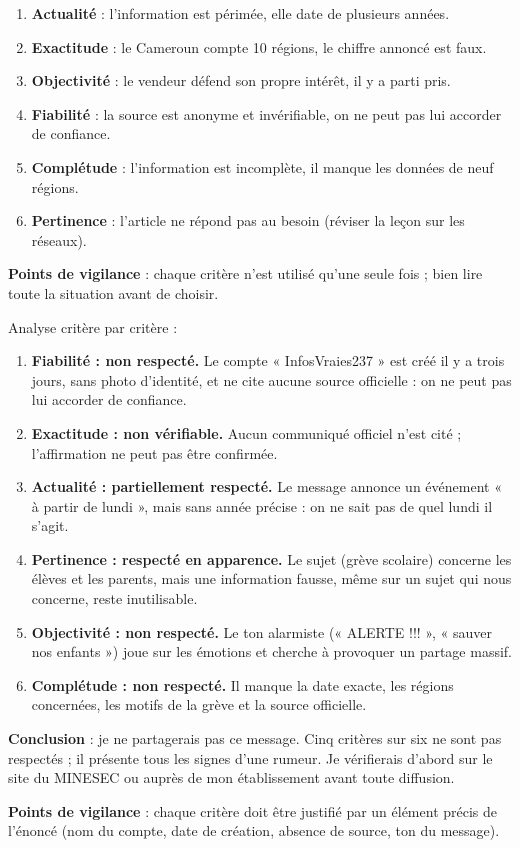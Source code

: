 \documentclass[11pt]{article}
\begin{document}
\begin{corrige}
\begin{enumerate}
\item \textbf{Actualité} : l'information est périmée, elle date de plusieurs années.
\item \textbf{Exactitude} : le Cameroun compte 10 régions, le chiffre annoncé est faux.
\item \textbf{Objectivité} : le vendeur défend son propre intérêt, il y a parti pris.
\item \textbf{Fiabilité} : la source est anonyme et invérifiable, on ne peut pas lui accorder de confiance.
\item \textbf{Complétude} : l'information est incomplète, il manque les données de neuf régions.
\item \textbf{Pertinence} : l'article ne répond pas au besoin (réviser la leçon sur les réseaux).
\end{enumerate}
\textbf{Points de vigilance} : chaque critère n'est utilisé qu'une seule fois ; bien lire toute la situation avant de choisir.
\end{corrige}

\begin{corrige}
Analyse critère par critère :
\begin{enumerate}
\item \textbf{Fiabilité : non respecté.} Le compte « InfosVraies237 » est créé il y a trois jours, sans photo d'identité, et ne cite aucune source officielle : on ne peut pas lui accorder de confiance.
\item \textbf{Exactitude : non vérifiable.} Aucun communiqué officiel n'est cité ; l'affirmation ne peut pas être confirmée.
\item \textbf{Actualité : partiellement respecté.} Le message annonce un événement « à partir de lundi », mais sans année précise : on ne sait pas de quel lundi il s'agit.
\item \textbf{Pertinence : respecté en apparence.} Le sujet (grève scolaire) concerne les élèves et les parents, mais une information fausse, même sur un sujet qui nous concerne, reste inutilisable.
\item \textbf{Objectivité : non respecté.} Le ton alarmiste (« ALERTE !!! », « sauver nos enfants ») joue sur les émotions et cherche à provoquer un partage massif.
\item \textbf{Complétude : non respecté.} Il manque la date exacte, les régions concernées, les motifs de la grève et la source officielle.
\end{enumerate}
\textbf{Conclusion} : je ne partagerais pas ce message. Cinq critères sur six ne sont pas respectés ; il présente tous les signes d'une rumeur. Je vérifierais d'abord sur le site du MINESEC ou auprès de mon établissement avant toute diffusion.

\textbf{Points de vigilance} : chaque critère doit être justifié par un élément précis de l'énoncé (nom du compte, date de création, absence de source, ton du message).
\end{corrige}
\end{document}
